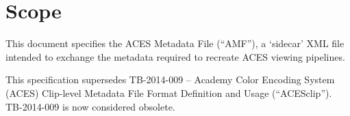 \cleardoublepage
\numberedformat	
\chapter{Scope} 	%

This document specifies the ACES Metadata File (``AMF''), a `sidecar' XML file intended to exchange the metadata required to recreate ACES viewing pipelines. 

This specification supersedes TB-2014-009 -- Academy Color Encoding System (ACES) Clip-level Metadata File Format Definition and Usage (``ACESclip'').  TB-2014-009 is now considered obsolete.